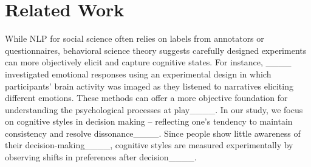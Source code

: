\section{Related Work}
While NLP for social science often relies on labels from annotators or questionnaires, behavioral science theory suggests carefully designed experiments can more objectively elicit and capture cognitive states.
For instance, ____ investigated emotional responses using an experimental design in which participants' brain activity was imaged as they listened to narratives eliciting different emotions. These methods can offer a more objective foundation for understanding the psychological processes at play____. In our study, we focus on cognitive styles in decision making -- reflecting one's tendency to maintain consistency and resolve dissonance____. %
Since people show little awareness of their decision-making____, 
 cognitive styles are measured experimentally by observing shifts in preferences after decision____. 


